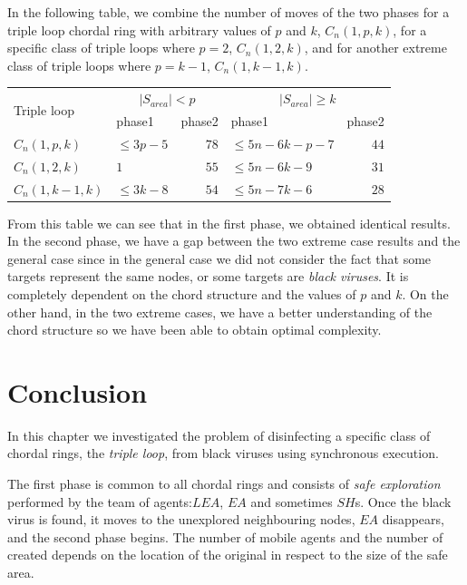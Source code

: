 In the following table, we combine the number of moves of the two phases for a triple loop chordal ring with arbitrary values of $p$ and $k$, $C_n(1,p,k)$, for a specific class of triple loops where $p=2$, $C_n(1,2,k)$, and for another extreme class of triple loops where $p=k-1$, $C_n(1,k-1,k)$.


\begin{center}
\begin{tabular}{|l|lr|lr|}\hline
\multirow {2}{1 in}{Triple loop} &
\multicolumn{2}{c|}{$|S_{area}|<p$} &
\multicolumn{2}{c|}{$|S_{area}|\ge k$}\\
 & phase1 & phase2 & phase1 & phase2   \\\hline\hline
$C_n(1,p,k)$  &$\leq 3p-5$     & $78$ & $\leq 5n-6k-p-7$    &  $44$  \\\hline
$C_n(1,2,k)$   &$1$ & $55$   & $\leq 5n-6k-9$ & $31$                 \\\hline
$C_n(1,k-1,k)$ &$\leq 3k-8$ & $54$   & $ \leq 5n-7k-6$   & $28$                          \\\hline
\end{tabular}
\end{center}



From this table we can see that in the first phase, we obtained identical results. In the second phase, we have a gap between the two extreme case results and the general case since in the general case we did not consider the fact that some targets represent the same nodes, or some targets are {\it black viruses}. It is completely dependent on the chord structure and the values of $p$ and $k$. On the other hand, in the two extreme cases, we have a better understanding of the chord structure so we have been able to obtain optimal complexity.

 



\section {Conclusion}


In this chapter we investigated the problem of disinfecting a specific class of chordal rings, the {\it triple loop}, from  black viruses using synchronous execution.


The first phase is common to all chordal rings and consists of {\it safe exploration} performed  by the team of agents:$LEA$, $EA$ and sometimes $SH$s. 
Once the black virus is found, it moves to the unexplored neighbouring nodes, $EA$ disappears, and the second phase begins. The number of mobile agents and the number of \bvs created depends on the location of the original \bv in respect to the size of the safe area.


